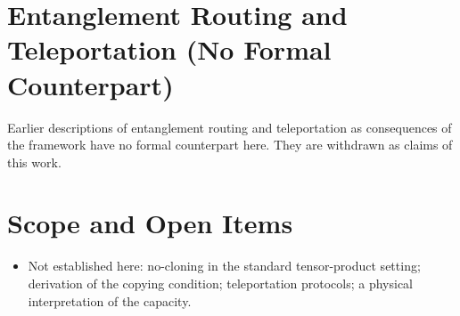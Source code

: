 \documentclass[11pt, a4paper]{article}
\begin{document}
\section{Entanglement Routing and Teleportation (No Formal Counterpart)}
Earlier descriptions of entanglement routing and teleportation as consequences of the framework have no formal counterpart here. They are withdrawn as claims of this work.

\section{Scope and Open Items}
\begin{itemize}
  \item Not established here: no-cloning in the standard tensor-product setting; derivation of the copying condition; teleportation protocols; a physical interpretation of the capacity.
\end{itemize}
\end{document}

